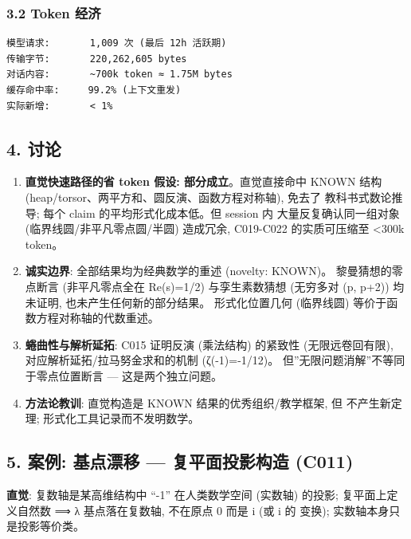 \documentclass[
]{article}
\providecommand{\tightlist}{%
  \setlength{\itemsep}{0pt}\setlength{\parskip}{0pt}}
\begin{document}
\subsubsection{3.2 Token 经济}\label{token-ux7ecfux6d4e}

\begin{verbatim}
模型请求:       1,009 次 (最后 12h 活跃期)
传输字节:       220,262,605 bytes
对话内容:       ~700k token ≈ 1.75M bytes
缓存命中率:     99.2% (上下文重发)
实际新增:       < 1%
\end{verbatim}

\subsection{4. 讨论}\label{ux8ba8ux8bba}

\begin{enumerate}
\def\labelenumi{\arabic{enumi}.}
\tightlist
\item
  \textbf{直觉快速路径的省 token 假设: 部分成立}。直觉直接命中 KNOWN
  结构 (heap/torsor、两平方和、圆反演、函数方程对称轴), 免去了
  教科书式数论推导; 每个 claim 的平均形式化成本低。但 session 内
  大量反复确认同一组对象 (临界线圆/非平凡零点圆/半圆) 造成冗余,
  C019-C022 的实质可压缩至 \textless300k token。
\item
  \textbf{诚实边界}: 全部结果均为经典数学的重述 (novelty: KNOWN)。
  黎曼猜想的零点断言 (非平凡零点全在 Re(s)=1/2) 与孪生素数猜想 (无穷多对
  (p, p+2)) 均未证明, 也未产生任何新的部分结果。 形式化位置几何
  (临界线圆) 等价于函数方程对称轴的代数重述。
\item
  \textbf{蜷曲性与解析延拓}: C015 证明反演 (乘法结构) 的紧致性
  (无限远卷回有限), 对应解析延拓/拉马努金求和的机制 (ζ(-1)=-1/12)。
  但''无限问题消解''不等同于零点位置断言 --- 这是两个独立问题。
\item
  \textbf{方法论教训}: 直觉构造是 KNOWN 结果的优秀组织/教学框架, 但
  不产生新定理; 形式化工具记录而不发明数学。
\end{enumerate}

\subsection{5. 案例: 基点漂移 --- 复平面投影构造
(C011)}\label{ux6848ux4f8b-ux57faux70b9ux6f02ux79fb-ux590dux5e73ux9762ux6295ux5f71ux6784ux9020-c011}

\textbf{直觉}: 复数轴是某高维结构中 ``-1'' 在人类数学空间 (实数轴)
的投影; 复平面上定义自然数 ⟹ λ 基点落在复数轴, 不在原点 0 而是 i (或 i
的 变换); 实数轴本身只是投影等价类。
\end{document}
